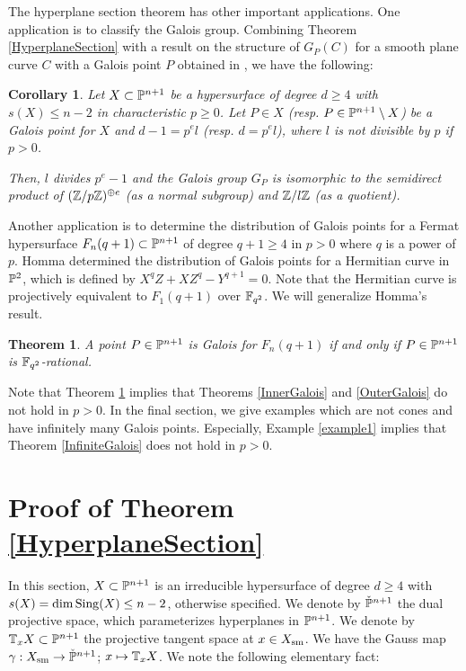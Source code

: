 \documentclass[10pt,oneside]{amsart}
\newtheorem{theorem}{Theorem}
\newtheorem{corollary}{Corollary}
\theoremstyle{definition}
\begin{document}
The hyperplane section theorem has other important applications. 
One application is to classify the Galois group. 
Combining Theorem \ref{HyperplaneSection} with a result on the structure of $G_P(C)$ for a smooth plane curve $C$ with a Galois point $P$ obtained in \cite{fukasawa1}, we have the following: 

\begin{corollary} \label{GroupStructure}
Let $X \subset \Bbb P^{n+1}$ be a hypersurface of degree $d \ge 4$ with $s(X) \le n-2$ in characteristic $p \ge 0$. 
Let $P \in X$ (resp. $P \in \Bbb P^{n+1} \setminus X$) be a Galois point for $X$ and $d-1=p^el$ (resp. $d=p^el$), where $l$ is not divisible by $p$ if $p>0$.  

Then, $l$ divides $p^e-1$ and the Galois group $G_P$ is isomorphic to the semidirect product of $(\Bbb Z/p\Bbb Z)^{\oplus e}$ (as a normal subgroup) and $\Bbb Z/l \Bbb Z$ (as a quotient). 
\end{corollary} 

Another application is to determine the distribution of Galois points for a Fermat hypersurface $F_n(q+1) \subset \Bbb P^{n+1}$ of degree $q+1 \ge 4$ in $p>0$ where $q$ is a power of $p$. 
Homma \cite{homma} determined the distribution of Galois points for a Hermitian curve in $\Bbb P^2$, which is defined by $X^{q}Z+XZ^{q}-Y^{q+1}=0$. 
Note that the Hermitian curve is projectively equivalent to $F_1(q+1)$ over $\Bbb F_{q^2}$. 
We will generalize Homma's result. 

\begin{theorem} \label{Fermat} 
A point $P \in \Bbb P^{n+1}$ is Galois for $F_n(q+1)$ if and only if $P \in \Bbb P^{n+1}$ is $\Bbb F_{q^2}$-rational. 
\end{theorem} 

Note that Theorem \ref{Fermat} implies that Theorems \ref{InnerGalois} and \ref{OuterGalois} do not hold in $p>0$. 
In the final section, we give examples which are not cones and have infinitely many Galois points. 
Especially, Example \ref{example1} implies that Theorem \ref{InfiniteGalois} does not hold in $p>0$. 

\section{Proof of Theorem \ref{HyperplaneSection}} 
In this section, $X \subset \Bbb P^{n+1}$ is an irreducible hypersurface of degree $d \ge 4$ with $s(X)=\dim {\rm Sing}(X) \le n-2$, otherwise specified. 
We denote by $\check{\Bbb P}^{n+1}$ the dual projective space, which parameterizes hyperplanes in $\Bbb P^{n+1}$. 
We denote by $\Bbb T_xX \subset \Bbb P^{n+1}$ the projective tangent space at $x \in X_{\rm sm}$. 
We have the Gauss map $\gamma: X_{\rm sm} \rightarrow \check{\Bbb P}^{n+1}$; $x \mapsto \Bbb T_xX$. 
We note the following elementary fact: 
\end{document}
